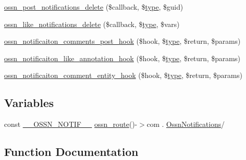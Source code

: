 \begin{DoxyCompactItemize}
\item 
\hyperlink{_ossn_notifications_2ossn__com_8php_a7dce6cf3e1ee8f6c0e80f077718edaae}{ossn\+\_\+post\+\_\+notifications\+\_\+delete} (\$callback, \$\hyperlink{_ossn_wall_2actions_2wall_2post_2group_8php_a2dc1bb4e1ed0029daa81ac0776b14b51}{type}, \$guid)
\item 
\hyperlink{_ossn_notifications_2ossn__com_8php_a0f1f0f129b372ae5e0d84eb60b589017}{ossn\+\_\+like\+\_\+notifications\+\_\+delete} (\$callback, \$\hyperlink{_ossn_wall_2actions_2wall_2post_2group_8php_a2dc1bb4e1ed0029daa81ac0776b14b51}{type}, \$vars)
\item 
\hyperlink{_ossn_notifications_2ossn__com_8php_abc278eca2aa422aecce19b0de0f5ab24}{ossn\+\_\+notificaiton\+\_\+comments\+\_\+post\+\_\+hook} (\$hook, \$\hyperlink{_ossn_wall_2actions_2wall_2post_2group_8php_a2dc1bb4e1ed0029daa81ac0776b14b51}{type}, \$return, \$params)
\item 
\hyperlink{_ossn_notifications_2ossn__com_8php_ab48f3ed6a54c75af88ebf7d2557a15f5}{ossn\+\_\+notificaiton\+\_\+like\+\_\+annotation\+\_\+hook} (\$hook, \$\hyperlink{_ossn_wall_2actions_2wall_2post_2group_8php_a2dc1bb4e1ed0029daa81ac0776b14b51}{type}, \$return, \$params)
\item 
\hyperlink{_ossn_notifications_2ossn__com_8php_a341517ffc8a9471fe45c9afd1f3c12d0}{ossn\+\_\+notificaiton\+\_\+comment\+\_\+entity\+\_\+hook} (\$hook, \$\hyperlink{_ossn_wall_2actions_2wall_2post_2group_8php_a2dc1bb4e1ed0029daa81ac0776b14b51}{type}, \$return, \$params)
\end{DoxyCompactItemize}
\subsection*{Variables}
\begin{DoxyCompactItemize}
\item 
const \hyperlink{_ossn_notifications_2ossn__com_8php_a26ea7c347c5bef85df640f59c5995fa6}{\+\_\+\+\_\+\+O\+S\+S\+N\+\_\+\+N\+O\+T\+I\+F\+\_\+\+\_\+} \hyperlink{ossn_8lib_8route_8php_ac23dc424aa33dcd57982b72f4ed1217e}{ossn\+\_\+route}()-\/$>$com . \textquotesingle{}\hyperlink{class_ossn_notifications}{Ossn\+Notifications}/\textquotesingle{}
\end{DoxyCompactItemize}


\subsection{Function Documentation}
